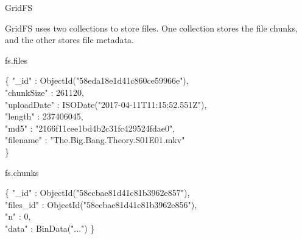 \documentclass{beamer}
\begin{document}
\begin{frame}{GridFS}
	\begin{minipage}[t]{\textwidth}
		GridFS uses two collections to store files. One collection stores the file chunks, and the other stores file metadata.
	\end{minipage}
    
    \begin{block}{fs.files}
        \scriptsize
        \begin{Alms*}
            \{ \NI
                "\_id" : ObjectId("58eda18e1d41c860ce59966e"), \\
                "chunkSize" : 261120, \\
                "uploadDate" : ISODate("2017-04-11T11:15:52.551Z"), \\
                "length" : 237406045, \\
                "md5" : "2166f11cee1bd4b2c31fc429524fdae0", \\
                "filename" : "The.Big.Bang.Theory.S01E01.mkv" \\
            \ND \}
        \end{Alms*}
    \end{block}
    
    \begin{block}{fs.chunks}
        \scriptsize
        \begin{Alms*}
            \{ \NI
            "\_id" : ObjectId("58ecbae81d41c81b3962e857"), \\
            "files\_id" : ObjectId("58ecbae81d41c81b3962e856"), \\
            "n" : 0, \\
            "data" : BinData("...")
            \ND \}
         \end{Alms*}
    \end{block}
    
\end{frame}
\end{document}
